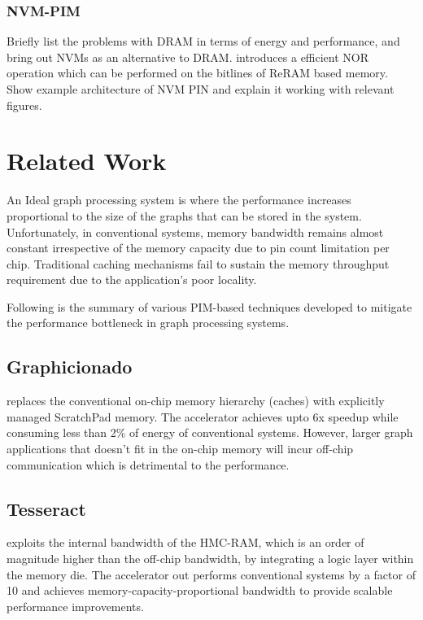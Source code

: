 \documentclass[journal,onecolumn]{IEEEtran}
\begin{document}
    \subsubsection{NVM-PIM}
      Briefly list the problems with DRAM in terms of energy and performance, and bring out NVMs as an alternative to DRAM.
      \cite{MagicNOR} introduces a efficient NOR operation which can be performed on the bitlines of ReRAM based memory. Show example architecture of NVM PIN and explain it working with relevant figures.
    
\section{Related Work}
An Ideal graph processing system is where the performance increases proportional to the size of the graphs that can be stored in the system. Unfortunately, in conventional systems, memory bandwidth remains almost constant irrespective of the memory capacity due to pin count limitation per chip. Traditional caching mechanisms fail to sustain the memory throughput requirement due to the application's poor locality. 

Following is the summary of various PIM-based techniques developed to mitigate the performance bottleneck in graph processing systems. \par

 \subsection{Graphicionado} \cite{Graphicionado} replaces the conventional on-chip memory hierarchy (caches) with explicitly managed ScratchPad memory. The accelerator achieves upto 6x speedup while consuming less than 2\% of energy of conventional systems. However, larger graph applications that doesn't fit in the on-chip memory will incur off-chip communication which is detrimental to the performance.

 \subsection{Tesseract} \cite{Tesseract} exploits the internal bandwidth of the HMC-RAM, which is an order of magnitude higher than the off-chip bandwidth, by integrating a logic layer within the memory die. The accelerator out performs conventional systems by a factor of 10 and achieves memory-capacity-proportional bandwidth to provide scalable performance improvements.
\end{document}
